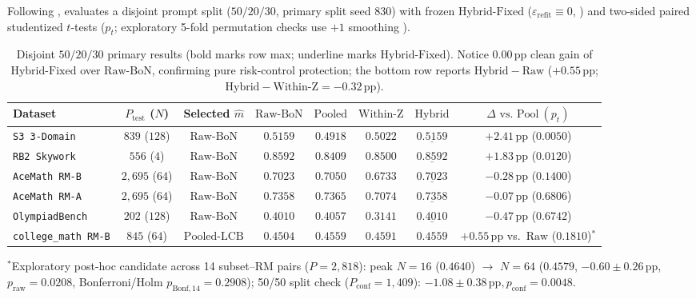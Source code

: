 \documentclass[10pt]{article}
\theoremstyle{plain}
\theoremstyle{definition}
\theoremstyle{remark}
\begin{document}
Following \citet{nadeau2003inference},  evaluates a disjoint prompt split ($50/20/30$, primary split seed $830$) with frozen $\mathrm{Hybrid\text{-}Fixed}$ ($\varepsilon_{\mathrm{refit}} \equiv 0$, ) and two-sided paired studentized $t$-tests ($p_t$; exploratory 5-fold permutation checks use $+1$ smoothing \citep{phipson2010permutation}).

\begin{table}[htbp]
\centering
\caption{Disjoint $50/20/30$ primary results (bold marks row max; underline marks $\mathrm{Hybrid\text{-}Fixed}$). Notice $0.00\,\mathrm{pp}$ clean gain of $\mathrm{Hybrid\text{-}Fixed}$ over $\mathrm{Raw\text{-}BoN}$, confirming pure risk-control protection; the bottom row reports $\mathrm{Hybrid} - \mathrm{Raw}$ ($+0.55\,\mathrm{pp}$; $\mathrm{Hybrid} - \mathrm{Within\text{-}Z} = -0.32\,\mathrm{pp}$).}
\label{tab:single-split}
\footnotesize
\setlength{\tabcolsep}{2.8pt}
\begin{tabular}{lccccccc}
\toprule
Dataset & $P_{\mathrm{test}}$ ($N$) & Selected $\hat{m}$ & $\mathrm{Raw\text{-}BoN}$ & $\mathrm{Pooled}$ & $\mathrm{Within\text{-}Z}$ & $\mathrm{Hybrid}$ & $\Delta\text{ vs.\ Pool}\ (p_t)$ \\
\midrule
\texttt{S3 3-Domain}     & $839$ ($128$)   & $\mathrm{Raw\text{-}BoN}$ & $\mathbf{0.5159}$ & $0.4918$ & $0.5022$ & $\underline{\mathbf{0.5159}}$ & $+2.41\,\mathrm{pp}$ ($0.0050$) \\
\texttt{RB2 Skywork}     & $556$ ($4$)     & $\mathrm{Raw\text{-}BoN}$ & $\mathbf{0.8592}$ & $0.8409$ & $0.8500$ & $\underline{\mathbf{0.8592}}$ & $+1.83\,\mathrm{pp}$ ($0.0120$) \\
\texttt{AceMath RM-B}    & $2{,}695$ ($64$)& $\mathrm{Raw\text{-}BoN}$ & $0.7023$ & $\mathbf{0.7050}$ & $0.6733$ & $\underline{0.7023}$          & $-0.28\,\mathrm{pp}$ ($0.1400$) \\
\texttt{AceMath RM-A}    & $2{,}695$ ($64$)& $\mathrm{Raw\text{-}BoN}$ & $0.7358$ & $\mathbf{0.7365}$ & $0.7074$ & $\underline{0.7358}$          & $-0.07\,\mathrm{pp}$ ($0.6806$) \\
\texttt{OlympiadBench}   & $202$ ($128$)   & $\mathrm{Raw\text{-}BoN}$ & $0.4010$ & $\mathbf{0.4057}$ & $0.3141$ & $\underline{0.4010}$          & $-0.47\,\mathrm{pp}$ ($0.6742$) \\
\midrule
\texttt{college\_math RM-B} & $845$ ($64$) & $\mathrm{Pooled\text{-}LCB}$ & $0.4504$ & $0.4559$ & $\mathbf{0.4591}$ & \underline{$0.4559$} & $+0.55\,\mathrm{pp}$ vs.\ $\mathrm{Raw}$ ($0.1810$)$^*$ \\
\bottomrule
\end{tabular}
\vspace{2pt}
{\footnotesize $^*$Exploratory post-hoc candidate across 14 subset--RM pairs ($P=2{,}818$): peak $N=16$ ($0.4640$) $\to$ $N=64$ ($0.4579$, $-0.60 \pm 0.26\,\mathrm{pp}$, $p_{\mathrm{raw}} = 0.0208$, Bonferroni/Holm $p_{\mathrm{Bonf},14} = 0.2908$); 50/50 split check ($P_{\mathrm{conf}}=1{,}409$): $-1.08 \pm 0.38\,\mathrm{pp}, p_{\mathrm{conf}}=0.0048$.}
\end{table}
\end{document}
